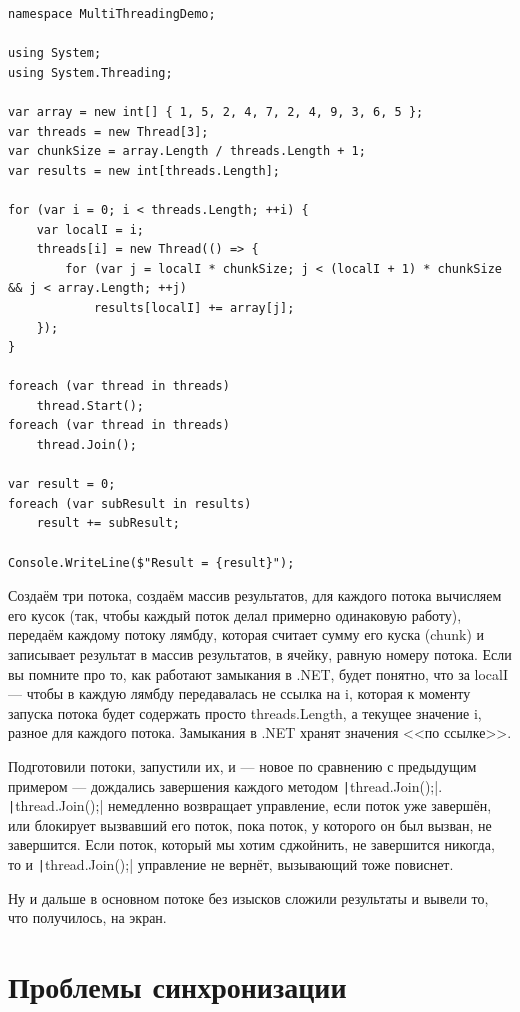 \documentclass{../../text-style}
\begin{document}
\begin{small}
    \begin{verbatim}
namespace MultiThreadingDemo;

using System;
using System.Threading;

var array = new int[] { 1, 5, 2, 4, 7, 2, 4, 9, 3, 6, 5 };
var threads = new Thread[3];
var chunkSize = array.Length / threads.Length + 1;
var results = new int[threads.Length];

for (var i = 0; i < threads.Length; ++i) {
    var localI = i;
    threads[i] = new Thread(() => {
        for (var j = localI * chunkSize; j < (localI + 1) * chunkSize && j < array.Length; ++j)
            results[localI] += array[j];
    });
}

foreach (var thread in threads)
    thread.Start();
foreach (var thread in threads)
    thread.Join();

var result = 0;
foreach (var subResult in results)
    result += subResult;

Console.WriteLine($"Result = {result}");
    \end{verbatim}
\end{small}

Создаём три потока, создаём массив результатов, для каждого потока вычисляем его кусок (так, чтобы каждый поток делал примерно одинаковую работу), передаём каждому потоку лямбду, которая считает сумму его куска (chunk) и записывает результат в массив результатов, в ячейку, равную номеру потока. Если вы помните про то, как работают замыкания в .NET, будет понятно, что за localI --- чтобы в каждую лямбду передавалась не ссылка на i, которая к моменту запуска потока будет содержать просто threads.Length, а текущее значение i, разное для каждого потока. Замыкания в .NET хранят значения <<по ссылке>>.

Подготовили потоки, запустили их, и --- новое по сравнению с предыдущим примером --- дождались завершения каждого методом \texttt|thread.Join();|. \texttt|thread.Join();| немедленно возвращает управление, если поток уже завершён, или блокирует вызвавший его поток, пока поток, у которого он был вызван, не завершится. Если поток, который мы хотим сджойнить, не завершится никогда, то и \texttt|thread.Join();| управление не вернёт, вызывающий тоже повиснет.

Ну и дальше в основном потоке без изысков сложили результаты и вывели то, что получилось, на экран.

\section{Проблемы синхронизации}
\end{document}
